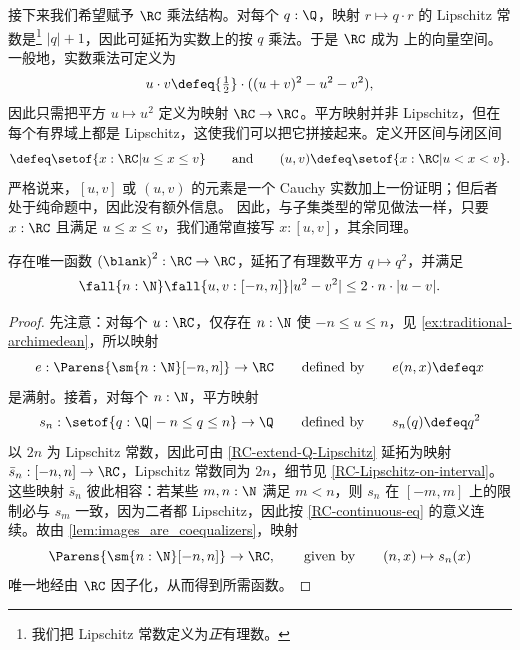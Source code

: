 %
接下来我们希望赋予 $\RC$ 乘法结构。对每个 $q : \Q$，映射
$r \mapsto q \cdot r$ 的 Lipschitz 常数是\footnote{我们把 Lipschitz
  常数定义为\emph{正}有理数。} $|q| + 1$，因此可延拓为实数上的按 $q$ 乘法。于是 $\RC$ 成为 \Q 上的向量空间。
一般地，实数乘法可定义为
%
\begin{equation}
  u \cdot v \defeq
  {\textstyle \frac{1}{2}} \cdot ((u + v)^2 - u^2 - v^2),\label{mult-from-square}
\end{equation}
%
因此只需把平方 $u \mapsto u^2$ 定义为映射 $\RC \to \RC$。平方映射并非
Lipschitz，但在每个有界域上都是 Lipschitz，这使我们可以把它拼接起来。定义开区间与闭区间
%
%
%
%
\begin{equation*}
  [u,v] \defeq \setof{ x : \RC | u \leq x \leq v }
  \qquad\text{and}\qquad
  (u,v) \defeq \setof{ x : \RC | u < x < v }.
\end{equation*}
%
严格说来，$[u,v]$ 或 $(u,v)$ 的元素是一个 Cauchy 实数加上一份证明；但后者处于纯命题中，因此没有额外信息。
因此，与子集类型的常见做法一样，只要 $x:\RC$ 且满足 $u\leq x \leq v$，我们通常直接写 $x:[u,v]$，其余同理。

\begin{thm} \label{RC-squaring}
  存在唯一函数 ${(\blank)}^2 : \RC \to \RC$，延拓了有理数平方 $q \mapsto
  q^2$，并满足
  \begin{equation*}
    \fall{n : \N}
    \fall{u, v : [-n, n]}
    |u^2 - v^2| \leq 2 \cdot n \cdot |u - v|.
  \end{equation*}
\end{thm}

\begin{proof}
  先注意：对每个 $u : \RC$，仅存在 $n : \N$ 使 $-n
  \leq u \leq n$，见 \cref{ex:traditional-archimedean}，所以映射
  \begin{equation*}
    e : \Parens{\sm{n : \N} [-n, n]} \to \RC
    \qquad\text{defined by}\qquad
    e(n, x) \defeq x
  \end{equation*}
  是满射。接着，对每个 $n : \N$，平方映射
  \begin{equation*}
    s_n : \setof{ q : \Q | -n \leq q \leq n } \to \Q
    \qquad\text{defined by}\qquad
    s_n(q) \defeq q^2
  \end{equation*}
  以 $2 n$ 为 Lipschitz 常数，因此可由 \cref{RC-extend-Q-Lipschitz}
  延拓为映射 $\bar{s}_n : [-n, n] \to \RC$，Lipschitz 常数同为 $2 n$，细节见
  \cref{RC-Lipschitz-on-interval}。这些映射 $\bar{s}_n$ 彼此相容：若某些 $m, n : \N$ 满足
  $m < n$，则 $s_n$ 在 $[-m, m]$ 上的限制必与 $s_m$
  一致，因为二者都 Lipschitz，因此按
  \cref{RC-continuous-eq} 的意义连续。故由 \cref{lem:images_are_coequalizers}，映射
  \begin{equation*}
    \Parens{\sm{n : \N} [-n, n]} \to \RC,
    \qquad\text{given by}\qquad
    (n, x) \mapsto s_n(x)
  \end{equation*}
  唯一地经由 $\RC$ 因子化，从而得到所需函数。
\end{proof}


